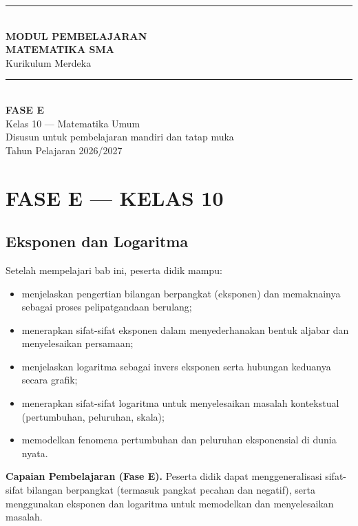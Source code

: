 \documentclass[11pt,a4paper]{report}
\theoremstyle{gaya}
\begin{document}
\begin{titlepage}
\centering
\vspace*{2cm}
{\color{biru}\rule{\textwidth}{2pt}}\\[0.6cm]
{\Huge\bfseries\color{biru} MODUL PEMBELAJARAN\\[0.3cm] MATEMATIKA SMA}\\[0.4cm]
{\Large Kurikulum Merdeka}\\[0.2cm]
{\color{biru}\rule{\textwidth}{2pt}}\\[1.2cm]

{\LARGE\bfseries FASE E}\\[0.3cm]
{\Large Kelas 10 — Matematika Umum}\\[2cm]

\vfill
{\large Disusun untuk pembelajaran mandiri dan tatap muka}\\[0.3cm]
{\large Tahun Pelajaran 2026/2027}
\end{titlepage}

\tableofcontents
\thispagestyle{empty}
\clearpage

\part*{\centering FASE E — KELAS 10}

\chapter{Eksponen dan Logaritma}
\begin{tujuan}
Setelah mempelajari bab ini, peserta didik mampu:
\begin{itemize}[leftmargin=*,topsep=2pt]
  \item menjelaskan pengertian bilangan berpangkat (eksponen) dan memaknainya sebagai proses pelipatgandaan berulang;
  \item menerapkan sifat-sifat eksponen dalam menyederhanakan bentuk aljabar dan menyelesaikan persamaan;
  \item menjelaskan logaritma sebagai invers eksponen serta hubungan keduanya secara grafik;
  \item menerapkan sifat-sifat logaritma untuk menyelesaikan masalah kontekstual (pertumbuhan, peluruhan, skala);
  \item memodelkan fenomena pertumbuhan dan peluruhan eksponensial di dunia nyata.
\end{itemize}
\textbf{Capaian Pembelajaran (Fase E).} Peserta didik dapat menggeneralisasi sifat-sifat bilangan berpangkat (termasuk pangkat pecahan dan negatif), serta menggunakan eksponen dan logaritma untuk memodelkan dan menyelesaikan masalah.
\end{tujuan}
\end{document}
